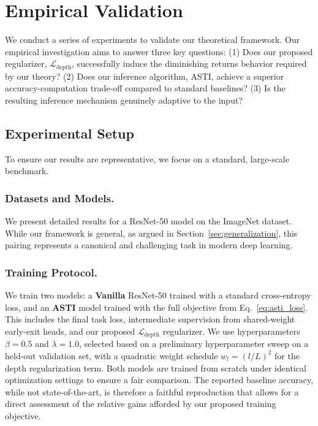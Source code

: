 \documentclass[12pt]{imsart}
\newcommand{\Ldepth}{\mathcal{L}_{\text{depth}}}
\theoremstyle{plain}
\theoremstyle{definition}
\begin{document}
\section{Empirical Validation}
\label{sec:empirical}
We conduct a series of experiments to validate our theoretical framework. Our empirical investigation aims to answer three key questions: (1) Does our proposed regularizer, $\Ldepth$, successfully induce the diminishing returns behavior required by our theory? (2) Does our inference algorithm, ASTI, achieve a superior accuracy-computation trade-off compared to standard baselines? (3) Is the resulting inference mechanism genuinely adaptive to the input?

\subsection{Experimental Setup}
To ensure our results are representative, we focus on a standard, large-scale benchmark.

\subsubsection{Datasets and Models.}
We present detailed results for a ResNet-50 model on the ImageNet dataset. While our framework is general, as argued in Section~\ref{sec:generalization}, this pairing represents a canonical and challenging task in modern deep learning.

\subsubsection{Training Protocol.}
We train two models: a \textbf{Vanilla} ResNet-50 trained with a standard cross-entropy loss, and an \textbf{ASTI} model trained with the full objective from Eq.~\eqref{eq:asti_loss}. This includes the final task loss, intermediate supervision from shared-weight early-exit heads, and our proposed $\Ldepth$ regularizer. We use hyperparameters $\beta=0.5$ and $\lambda=1.0$, selected based on a preliminary hyperparameter sweep on a held-out validation set, with a quadratic weight schedule $w_l = (l/L)^2$ for the depth regularization term. Both models are trained from scratch under identical optimization settings to ensure a fair comparison. The reported baseline accuracy, while not state-of-the-art, is therefore a faithful reproduction that allows for a direct assessment of the relative gains afforded by our proposed training objective.
\end{document}
